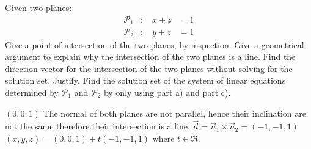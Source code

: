 
\begin{Exercise}[
name={},
title={}, 
difficulty=0,
origin={\cite{YL}}]
Given two planes:
\[
\begin{array}{llrrrrrrrr}
\mathcal{P}_1 & : & \; x +z & = 1\\
\mathcal{P}_2 & : & \; y+z & =1
\end{array}
\]
\Question Give a point of intersection of the two planes, by inspection.
\Question Give a geometrical argument to explain why the intersection of the two planes is a line.
\Question Find the direction vector for the intersection of the two planes without solving for the solution set.  Justify.
\Question Find the solution set of the system of linear equations determined by $\mathcal{P}_1$ and $\mathcal{P}_2$ by only using part a) and part c).
\end{Exercise}

\begin{Answer}
\Question $(0,0,1)$
\Question The normal of both planes are not parallel, hence their inclination are not the same therefore their intersection is a line.
\Question $\vec{d}=\vec{n}_1\times\vec{n}_2=(-1,-1,1)$
\Question $(x,y,z)=(0,0,1)+t(-1,-1,1)$ where $t\in\Re$.
\end{Answer}
